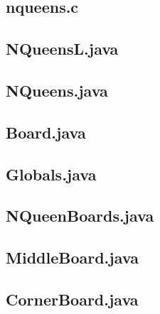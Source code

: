 \begin{landscape}
\begin{multicols}{2}
\tiny
\subsection{nqueens.c}\label{nqueen.c}

\subsection{NQueensL.java}

\subsection{NQueens.java}

\subsection{Board.java}

\subsection{Globals.java}

\subsection{NQueenBoards.java}

\subsection{MiddleBoard.java}

\subsection{CornerBoard.java}


\end{multicols}
\end{landscape}
